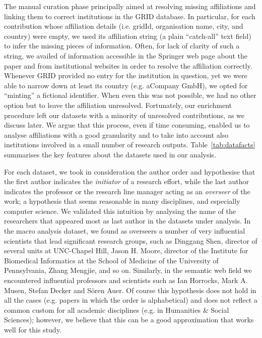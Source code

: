 \documentclass{llncs}
\begin{document}
The manual curation phase principally aimed at resolving missing affiliations and linking them to correct institutions in the GRID database.
In particular, for each contribution whose affiliation details (i.e. gridId, organisation name, city, and country) were empty, we used its affiliation string (a plain ``catch-all'' text field) to infer the missing pieces of information.
Often, for lack of clarity of such a string, we availed of information accessible in the Springer web page about the paper and from institutional websites in order to resolve the affiliation correctly.
Whenever GRID provided no entry for the institution in question, yet we were able to narrow down at least its country (e.g. aCompany GmbH), we opted for ``minting'' a fictional identifier.
When even this was not possible, we had no other option but to leave the affiliation unresolved. 
Fortunately, our enrichment procedure left our datasets with a minority of unresolved contributions, as we discuss later.
We argue that this process, even if time consuming, enabled us to analyse affiliations with a good granularity and to take into account also institutions involved in a small number of research outputs.
Table~\ref{tab:datafacts} summarises the key features about the datasets used in our analysis.

For each dataset, we took in consideration the author order and hypothesise that the first author indicates the \textit{initiator} of a research effort, while the last author indicates the professor or the research line manager acting as an \textit{overseer} of the work; a hypothesis that seems reasonable in many disciplines, and especially computer science.
We validated this intuition by analysing the name of the researchers that appeared most as last author in the datasets under analysis. In the macro analysis dataset, we found as overseers a number of very influential scientists that lead significant research groups, such as Dinggang Shen, director of several units at UNC-Chapel Hill, Jason H. Moore, director of the Institute for Biomedical Informatics at the School of Medicine of the University of Pennsylvania, Zhang Mengjie, and so on.
Similarly, in the semantic web field we encountered influential professors and scientists such as Ian Horrocks, Mark A. Musen, Stefan Decker and S\"{o}ren Auer.
Of course this hypothesis does not hold in all the cases (e.g. papers in which the order is alphabetical) and does not reflect a common custom for all academic disciplines (e.g. in Humanities \& Social Sciences); however, we believe that this can be a good approximation that works well for this study.
\end{document}
